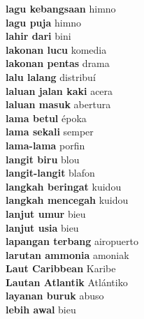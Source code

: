 \textbf{ lagu kebangsaan  } himno \\
\textbf{ lagu puja  } himno \\
\textbf{ lahir dari  } bini \\
\textbf{ lakonan lucu  } komedia \\
\textbf{ lakonan pentas  } drama \\
\textbf{ lalu lalang  } distribuí \\
\textbf{ laluan jalan kaki  } acera \\
\textbf{ laluan masuk  } abertura \\
\textbf{ lama betul  } époka \\
\textbf{ lama sekali  } semper \\
\textbf{ lama-lama  } porfin \\
\textbf{ langit biru  } blou \\
\textbf{ langit-langit  } blafon \\
\textbf{ langkah beringat  } kuidou \\
\textbf{ langkah mencegah  } kuidou \\
\textbf{ lanjut umur  } bieu \\
\textbf{ lanjut usia  } bieu \\
\textbf{ lapangan terbang  } airopuerto \\
\textbf{ larutan ammonia  } amoniak \\
\textbf{ Laut Caribbean  } Karibe \\
\textbf{ Lautan Atlantik  } Atlántiko \\
\textbf{ layanan buruk  } abuso \\
\textbf{ lebih awal  } bieu \\
